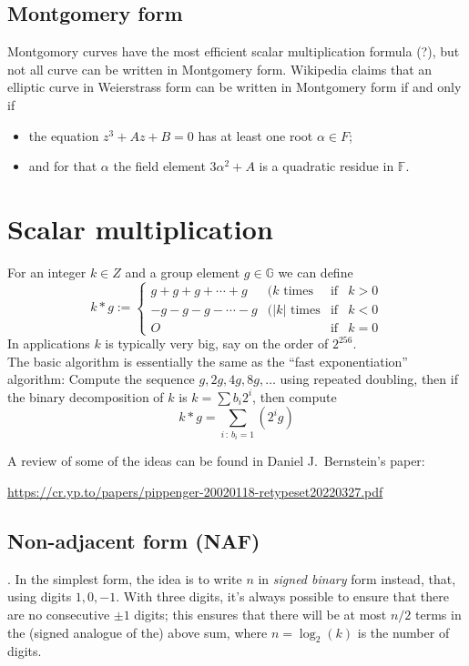 \documentclass[12pt,draft,a4paper,openany,oneside]{amsbook}
\def\F{\mathbb{F}}
\def\G{\mathbb{G}}
\theoremstyle{plain}
\theoremstyle{definition}
\begin{document}
\subsection{Montgomery form}
Montgomory curves have the most efficient scalar multiplication formula (?), but
not all curve can be written in Montgomery form. Wikipedia claims that an 
elliptic curve in Weierstrass form can be written in Montgomery form if and only if
\begin{itemize}
\item the equation $z^3 + Az + B=0$ has at least one root $\alpha\in F$;
\item and for that $\alpha$ the field element $3\alpha^2 + A$ is a quadratic residue in $\F$.
\end{itemize}


\section{Scalar multiplication}

For an integer $k\in Z$ and a group element $g\in\G$ we can define
\[ k*g := \left\{\begin{array}{llll}
g+g+g+\cdots +g  &(k   \textrm{ times}&\textrm{if}& k > 0 \\
-g-g-g-\cdots -g &(|k| \textrm{ times}&\textrm{if}& k < 0 \\
O                &                    &\textrm{if}& k = 0
\end{array}
\right.
\]
In applications $k$ is typically very big, say on the order of $2^{256}$.\\

The basic algorithm is essentially the same as the ``fast exponentiation''
algorithm: Compute the sequence $g,2g,4g,8g,\dots$ using repeated doubling,
then if the binary decomposition of $k$ is $k=\sum b_i2^i$, then compute
\[ k*g = \sum_{i\,:\,b_i=1} (2^i g) \]

A review of some of the ideas can be found in Daniel J.~Bernstein's paper:

\noindent
\url{https://cr.yp.to/papers/pippenger-20020118-retypeset20220327.pdf}


\subsection{Non-adjacent form (NAF)}.
In the simplest form, the idea is to write $n$ in \emph{signed binary} form
instead, that, using digits $1,0,-1$. With three digits, it's always
possible to ensure that there are no consecutive $\pm 1$ digits; this ensures
that there will be at most $n/2$ terms in the (signed analogue of the) 
above sum, where $n=\log_2(k)$ is the number of digits.
\end{document}
